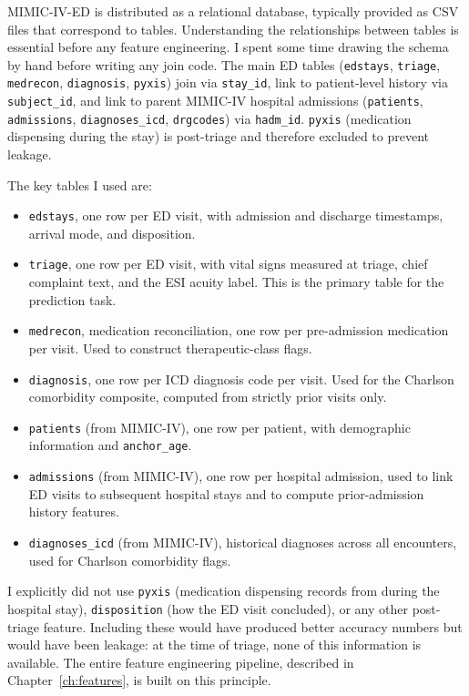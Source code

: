 MIMIC-IV-ED is distributed as a relational database, typically provided as CSV files that correspond to tables. Understanding the relationships between tables is essential before any feature engineering. I spent some time drawing the schema by hand before writing any join code. The main ED tables (\texttt{edstays}, \texttt{triage}, \texttt{medrecon}, \texttt{diagnosis}, \texttt{pyxis}) join via \texttt{stay\_id}, link to patient-level history via \texttt{subject\_id}, and link to parent MIMIC-IV hospital admissions (\texttt{patients}, \texttt{admissions}, \texttt{diagnoses\_icd}, \texttt{drgcodes}) via \texttt{hadm\_id}. \texttt{pyxis} (medication dispensing during the stay) is post-triage and therefore excluded to prevent leakage.

The key tables I used are:

\begin{itemize}
 \item \texttt{edstays}, one row per ED visit, with admission and discharge timestamps, arrival mode, and disposition.
 \item \texttt{triage}, one row per ED visit, with vital signs measured at triage, chief complaint text, and the ESI acuity label. This is the primary table for the prediction task.
 \item \texttt{medrecon}, medication reconciliation, one row per pre-admission medication per visit. Used to construct therapeutic-class flags.
 \item \texttt{diagnosis}, one row per ICD diagnosis code per visit. Used for the Charlson comorbidity composite, computed from strictly prior visits only.
 \item \texttt{patients} (from MIMIC-IV), one row per patient, with demographic information and \texttt{anchor\_age}.
 \item \texttt{admissions} (from MIMIC-IV), one row per hospital admission, used to link ED visits to subsequent hospital stays and to compute prior-admission history features.
 \item \texttt{diagnoses\_icd} (from MIMIC-IV), historical diagnoses across all encounters, used for Charlson comorbidity flags.
\end{itemize}

I explicitly did not use \texttt{pyxis} (medication dispensing records from during the hospital stay), \texttt{disposition} (how the ED visit concluded), or any other post-triage feature. Including these would have produced better accuracy numbers but would have been leakage: at the time of triage, none of this information is available. The entire feature engineering pipeline, described in Chapter~\ref{ch:features}, is built on this principle.

